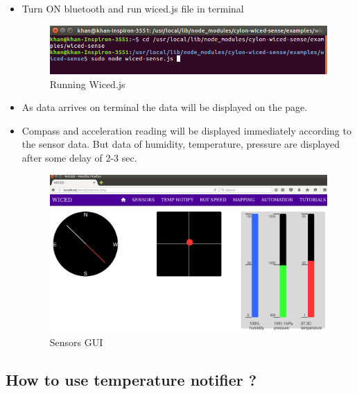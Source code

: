 \documentclass[11pt,a4paper]{article}
\begin{document}
\begin{itemize}
	 \item Turn ON bluetooth and run wiced.js file in terminal
	 
	 \begin{figure}[h]
    \centering
	\includegraphics[scale=0.5]{runwicedjs.png}
	 \caption{Running Wiced.js}
	\end{figure}

	 \item As data arrives on terminal the data will be displayed on the page.
	 
	 \newpage 
	 \item Compass and acceleration reading will be displayed immediately according to the sensor data. But data of humidity, temperature, pressure are displayed after some delay of 2-3 sec.
	 
	 \begin{figure}[h]
    \centering{}
    \includegraphics[scale=0.3]{sensor.png}
	\caption{Sensors GUI}
	\end{figure}
	 \end{itemize}
	 
	 
	 
	 \newpage
	 \subsection{How to use temperature notifier ?}
	 
\end{document}
